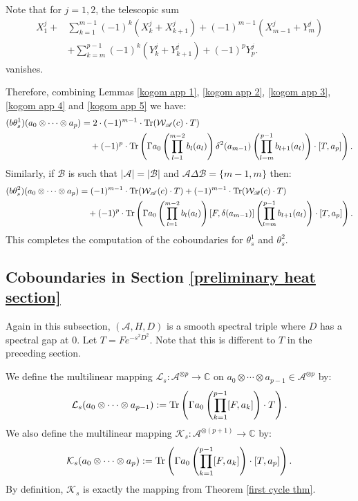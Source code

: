     Note that for $j = 1,2$, the telescopic sum
    \begin{align*}
        X_1^j+&\sum_{k=1}^{m-1}(-1)^k(X_k^j+X_{k+1}^j)+(-1)^{m-1}(X_{m-1}^j+Y_m^j)\\
            &+\sum_{k=m}^{p-1}(-1)^k(Y_k^j+Y_{k+1}^j)+(-1)^pY_p^j.
    \end{align*}
    vanishes.

    Therefore, combining Lemmas \ref{kogom app 1}, \ref{kogom app 2}, \ref{kogom app 3}, \ref{kogom app 4} and \ref{kogom app 5} we have:
    \begin{align*}
        (b\theta_s^1)(a_0\otimes\cdots\otimes a_p) &= 2\cdot(-1)^{m-1}\cdot{\rm Tr}(\mathcal{W}_{\mathscr{A}}(c)\cdot T)\\
                                                   &\quad + (-1)^p\cdot {\rm Tr}\left(\Gamma a_0\left(\prod_{l=1}^{m-2}b_l(a_l)\right)\delta^2(a_{m-1})\left(\prod_{l=m}^{p-1}b_{l+1}(a_l)\right)\cdot[T,a_p]\right).
    \end{align*}
    Similarly, if $\mathscr{B}$ is such that $|\mathscr{A}| = |\mathscr{B}|$ and $\mathscr{A}\Delta \mathscr{B} = \{m-1,m\}$ then:
    \begin{align*}
        (b\theta_s^2)(a_0\otimes\cdots\otimes a_p) &= (-1)^{m-1}\cdot{\rm Tr}(\mathcal{W}_{\mathscr{A}}(c)\cdot T)+(-1)^{m-1}\cdot{\rm Tr}(\mathcal{W}_{\mathscr{B}}(c)\cdot T)\\
                                                   &\quad +(-1)^p\cdot {\rm Tr}\left(\Gamma a_0\left(\prod_{l=1}^{m-2}b_l(a_l)\right)[F,\delta(a_{m-1})]\left(\prod_{l=m}^{p-1}b_{l+1}(a_l)\right)\cdot [T,a_p]\right).
    \end{align*}
    This completes the computation of the coboundaries for $\theta^1_s$ and $\theta^2_s$.

\subsection{Coboundaries in Section \ref{preliminary heat section}}

    Again in this subsection, $(\mathcal{A},H,D)$ is a smooth spectral triple where $D$ has a spectral gap at $0$. Let $T = Fe^{-s^2D^2}$. Note that this is different
    to $T$ in the preceding section.

    We define the multilinear mapping $\mathcal{L}_s:\mathcal{A}^{\otimes p}\to\mathbb{C}$ on $a_0\otimes \cdots\otimes a_{p-1} \in \mathcal{A}^{\otimes p}$ by:
    \begin{equation*}
        \mathcal{L}_s(a_0\otimes\cdots\otimes a_{p-1}) := {\rm Tr}\left(\Gamma a_0\left(\prod_{k=1}^{p-1}[F,a_k]\right)\cdot T\right).
    \end{equation*}
    We also define the multilinear mapping $\mathcal{K}_s:\mathcal{A}^{\otimes (p+1)}\to\mathbb{C}$ by:
    \begin{equation*}
        \mathcal{K}_s(a_0\otimes\cdots\otimes a_p) := {\rm Tr}\left(\Gamma a_0\left(\prod_{k=1}^{p-1}[F,a_k]\right)\cdot [T,a_p]\right).
    \end{equation*}
    By definition, $\mathcal{K}_s$ is exactly the mapping from Theorem \ref{first cycle thm}.


